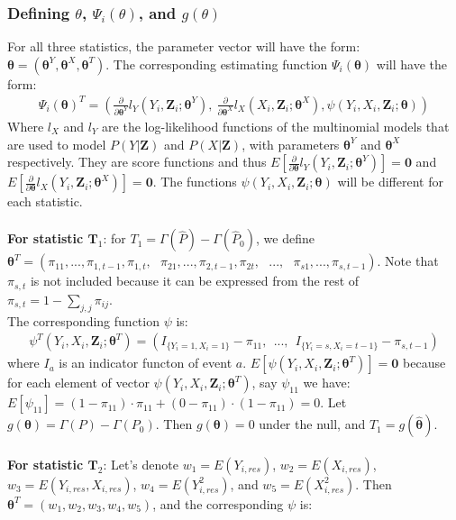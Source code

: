 \documentclass[]{article}
\begin{document}
\subsubsection{Defining $\theta$, $\Psi_i(\theta)$, and $g(\theta)$}
For all three statistics, the parameter vector will have the form: $\pmb{\theta} = (\pmb{\theta}^Y, \pmb{\theta}^X, \pmb{\theta}^T)$. The corresponding estimating function $\Psi_i(\pmb{\theta})$ will have the form:
$$
\begin{aligned}
	\Psi_i(\pmb{\theta})^T = \left(\frac{\partial}{\partial \pmb{\theta}^Y}l_Y(Y_i, \pmb{Z}_i; \pmb{\theta}^Y),~\frac{\partial}{\partial \pmb{\theta}^X} l_X(X_i, \pmb{Z}_i;\pmb{\theta}^X), \psi(Y_i, X_i, \pmb{Z}_i;\pmb{\theta})\right)
\end{aligned}
$$
Where $l_X$ and $l_Y$ are the log-likelihood functions of the multinomial models that are used to model $P(Y|\pmb{Z})$ and $P(X|\pmb{Z})$, with parameters $\pmb{\theta}^Y$ and $\pmb{\theta}^X$ respectively. They are score functions and thus $E\left[ \frac{\partial}{\partial\pmb{\theta}}l_Y(Y_i, \pmb{Z}_i; \pmb{\theta}^Y) \right]=\pmb{0}$ and $E\left[ \frac{\partial}{\partial\pmb{\theta}}l_X(Y_i, \pmb{Z}_i; \pmb{\theta}^X) \right]=\pmb{0}$. The functions $\psi(Y_i, X_i, \pmb{Z}_i;\pmb{\theta})$ will be different for each statistic.\\
~\\
\textbf{For statistic $\pmb{T}_1$}: for $T_1=\Gamma(\hat{P}) - \Gamma(\hat{P}_0)$, we define $\pmb{\theta}^T = (\pi_{11},...,\pi_{1,t-1},\pi_{1,t}, ~~~\pi_{21},...,\pi_{2,t-1},\pi_{2t}, ~~~..., ~~~\pi_{s1},...,\pi_{s,t-1})$. Note that $\pi_{s,t}$ is not included because it can be expressed from the rest of $\pi_{s,t} = 1-\sum_{j,j}\pi_{ij}$.\\
The corresponding function $\psi$ is:
$$
\begin{aligned}
	\psi^T(Y_i,X_i,\pmb{Z}_i;\pmb{\theta}^T) = (I_{\{Y_i=1,X_i=1\}}-\pi_{11}, ~~...,~~I_{\{Y_i=s,X_i=t-1\}}-\pi_{s,t-1})
\end{aligned}
$$
where $I_a$ is an indicator functon of event $a$. $E[\psi(Y_i,X_i,\pmb{Z}_i;\pmb{\theta}^T)]=\pmb{0}$ because for each element of vector $\psi(Y_i,X_i,\pmb{Z}_i;\pmb{\theta}^T)$, say $\psi_{11}$ we have: $E[\psi_{11}] = (1-\pi_{11})\cdot \pi_{11} + (0-\pi_{11})\cdot (1-\pi_{11})=0$. Let $g(\pmb{\theta}) = \Gamma(P) - \Gamma(P_0)$. Then $g(\pmb{\theta})=0$ under the null, and $T_1=g(\hat{\pmb{\theta}})$.\\
~\\
\textbf{For statistic $\pmb{T}_2$}: Let's denote $w_1=E(Y_{i,res})$, $w_2=E(X_{i,res})$, $w_3=E(Y_{i,res}, X_{i,res})$, $w_4=E(Y^2_{i,res})$, and $w_5=E(X^2_{i,res})$. Then $\pmb{\theta}^T = (w_1, w_2, w_3, w_4, w_5)$, and the corresponding $\psi$ is:
\end{document}
